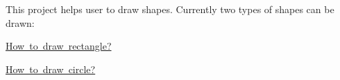 This project helps user to draw shapes. Currently two types of shapes can be drawn\+:
\begin{DoxyItemize}
\item \mbox{\hyperlink{drawingRectanglePage}{How to draw rectangle?}}
\item \mbox{\hyperlink{drawingCirclePage}{How to draw circle?}} 
\end{DoxyItemize}